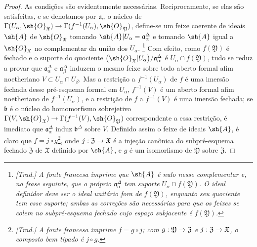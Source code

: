 \documentclass[oneside]{amsart}
\makeatletter
\newcommand{\ega@arrow}[2]{\mathchoice{#1}{#2}{#2}{#2}}
\renewcommand{\to}{\ega@arrow{\longrightarrow}{\rightarrow}}
\makeatother
\begin{document}
\begin{proof}
As condições são evidentemente necessárias.
Reciprocamente, se elas são satisfeitas, e se denotamos por $\mathfrak{a}_\alpha$ o núcleo de $\Gamma(U_\alpha,\sh{O}_\mathfrak{X})\to\Gamma(f^{-1}(U_\alpha),\sh{O}_\mathfrak{Y})$, define-se um feixe coerente de ideais $\sh{A}$ de $\sh{O}_\mathfrak{X}$ tomando $\sh{A}|U_\alpha=\mathfrak{a}_\alpha^\Delta$ e tomando $\sh{A}$ igual a $\sh{O}_\mathfrak{X}$ no complementar da união dos $U_\alpha$.
\footnote{\emph{[Trad.] A fonte francesa imprime que $\sh{A}$ é nulo nesse complementar e, na frase seguinte, que o próprio $\mathfrak{a}_\alpha^\Delta$ tem suporte $U_\alpha\cap f(\mathfrak{Y})$. O ideal definidor deve ser o ideal unitário fora de $f(\mathfrak{Y})$, enquanto seu quociente tem esse suporte; ambas as correções são necessárias para que os feixes se colem no subpré-esquema fechado cujo espaço subjacente é $f(\mathfrak{Y})$.}}
Com efeito, como $f(\mathfrak{Y})$ é fechado e o suporte do quociente $\bigl(\sh{O}_\mathfrak{X}|U_\alpha\bigr)/\mathfrak{a}_\alpha^\Delta$ é $U_\alpha\cap f(\mathfrak{Y})$, tudo se reduz a provar que $\mathfrak{a}_\alpha^\Delta$ e $\mathfrak{a}_\beta^\Delta$ induzem o mesmo feixe sobre todo aberto formal afim noetheriano $V\subset U_\alpha\cap U_\beta$.
Mas a restrição a $f^{-1}(U_\alpha)$ de $f$ é uma imersão fechada desse pré-esquema formal em $U_\alpha$, $f^{-1}(V)$ é um aberto formal afim noetheriano de $f^{-1}(U_\alpha)$, e a restrição de $f$ a $f^{-1}(V)$ é uma imersão fechada;
se $\mathfrak{b}$ é o núcleo do homomorfismo sobrejetivo $\Gamma(V,\sh{O}_\mathfrak{X})\to\Gamma(f^{-1}(V),\sh{O}_\mathfrak{Y})$ correspondente a essa restrição, é imediato  que $\mathfrak{a}_\alpha^\Delta$ induz $\mathfrak{b}^\Delta$ sobre $V$.
Definido assim o feixe de ideais $\sh{A}$, é claro que $f=j\circ g$\footnote{\emph{[Trad.] A fonte francesa imprime $f=g\circ j$; com $g:\mathfrak{Y}\to\mathfrak{Z}$ e $j:\mathfrak{Z}\to\mathfrak{X}$, o composto bem tipado é $j\circ g$.}}, onde $j:\mathfrak{Z}\to\mathfrak{X}$ é a injeção canônica do subpré-esquema fechado $\mathfrak{Z}$ de $\mathfrak{X}$ definido por $\sh{A}$, e $g$ é um isomorfismo de $\mathfrak{Y}$ sobre $\mathfrak{Z}$.
\end{proof}
\end{document}
